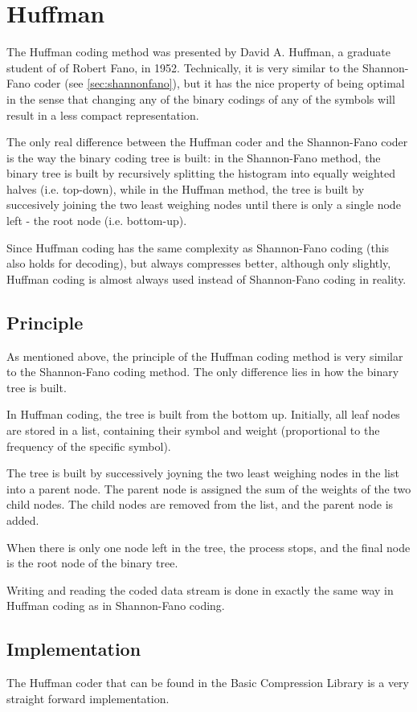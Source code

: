 \documentclass[a4paper,11pt,oneside]{report}
\begin{document}
\section{Huffman}
\label{sec:huffman}
The Huffman coding method was presented by David A. Huffman, a graduate
student of of Robert Fano, in 1952. Technically, it is very similar to the
Shannon-Fano coder (see \ref{sec:shannonfano}), but it has the nice
property of being optimal in the sense that changing any of the binary
codings of any of the symbols will result in a less compact representation.

The only real difference between the Huffman coder and the Shannon-Fano
coder is the way the binary coding tree is built: in the Shannon-Fano
method, the binary tree is built by recursively splitting the histogram
into equally weighted halves (i.e. top-down), while in the Huffman
method, the tree is built by succesively joining the two least weighing
nodes until there is only a single node left - the root node (i.e.
bottom-up).

Since Huffman coding has the same complexity as Shannon-Fano coding
(this also holds for decoding), but always compresses better, although
only slightly, Huffman coding is almost always used instead of Shannon-Fano
coding in reality.


\subsection{Principle}
As mentioned above, the principle of the Huffman coding method is very
similar to the Shannon-Fano coding method. The only difference lies in
how the binary tree is built.

In Huffman coding, the tree is built from the bottom up. Initially,
all leaf nodes are stored in a list, containing their symbol and weight
(proportional to the frequency of the specific symbol).

The tree is built by successively joyning the two least weighing nodes
in the list into a parent node. The parent node is assigned the sum of
the weights of the two child nodes. The child nodes are removed from the
list, and the parent node is added.

When there is only one node left in the tree, the process stops, and
the final node is the root node of the binary tree.

Writing and reading the coded data stream is done in exactly the same
way in Huffman coding as in Shannon-Fano coding.


\subsection{Implementation}
The Huffman coder that can be found in the Basic Compression Library is
a very straight forward implementation.
\end{document}
